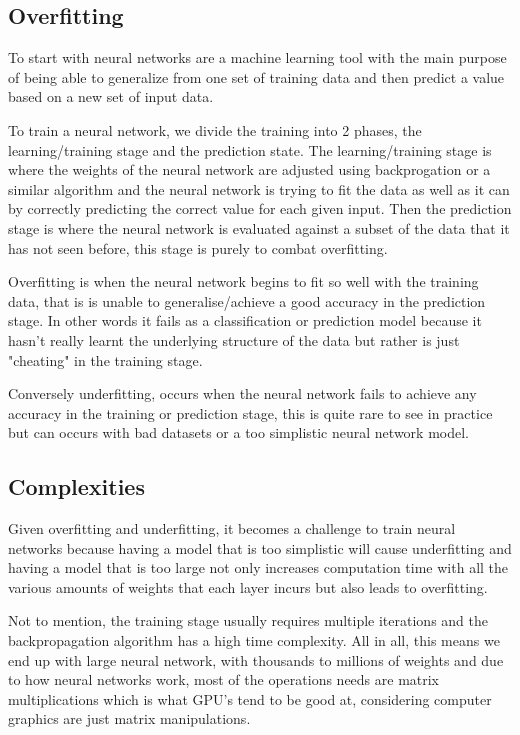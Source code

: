 \documentclass[a4paper,oneside,phd,etd]{BYUPhys}
\begin{document}
\subsection{Overfitting}
To start with neural networks are a machine learning tool with the main purpose of being able to generalize from one set of training data and then predict a value based on a new set of input data. 

To train a neural network, we divide the training into 2 phases, the learning/training stage and the prediction state. The learning/training stage is where the weights of the neural network are adjusted using backprogation or a similar algorithm and the neural network is trying to fit the data as well as it can by correctly predicting the correct value for each given input. Then the prediction stage is where the neural network is evaluated against a subset of the data that it has not seen before, this stage is purely to combat overfitting. 

Overfitting is when the neural network begins to fit so well with the training data, that is is unable to generalise/achieve a good accuracy in the prediction stage. In other words it fails as a classification or prediction model because it hasn't really learnt the underlying structure of the data but rather is just "cheating" in the training stage.

Conversely underfitting, occurs when the neural network fails to achieve any accuracy in the training or prediction stage, this is quite rare to see in practice but can occurs with bad datasets or a too simplistic neural network model\cite{underfitting-machine-learning}.

\subsection{Complexities}
Given overfitting and underfitting, it becomes a challenge to train neural networks because having a model that is too simplistic will cause underfitting and having a model that is too large not only increases computation time with all the various amounts of weights that each layer incurs but also leads to overfitting\cite{MODEL-COMPLEXITY}. 

Not to mention, the training stage usually requires multiple iterations and the backpropagation algorithm has a high time complexity\cite{backprop-time-complexity}. All in all, this means we end up with large neural network, with thousands to millions of weights and due to how neural networks work, most of the operations needs are matrix multiplications which is what GPU's tend to be good at, considering computer graphics are just matrix manipulations.
\end{document}
